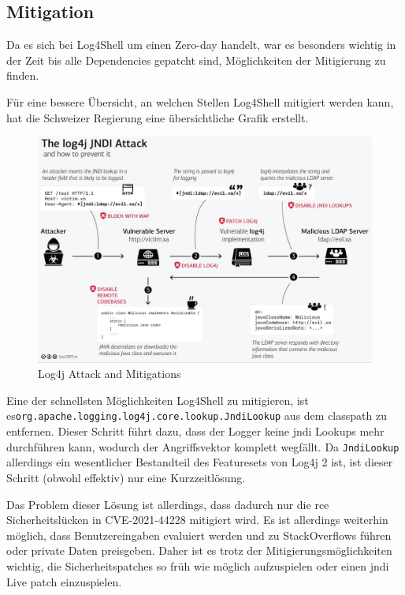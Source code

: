 
\clearpage
\subsection{Mitigation}\label{subsec:mitigation}
Da es sich bei Log4Shell um einen Zero-day handelt, war es besonders wichtig in der Zeit bis alle Dependencies gepatcht sind, Möglichkeiten der Mitigierung zu finden.

Für eine bessere Übersicht, an welchen Stellen Log4Shell mitigiert werden kann, hat die Schweizer Regierung eine übersichtliche Grafik erstellt.

\begin{figure}[!htb]\label{fig:log4jattackgraphic}
    \begin{center}
        \includegraphics[width=\textwidth]{images/log4j_attack}
    \end{center}
    \caption{Log4j Attack and Mitigations}
\end{figure}

Eine der schnellsten Möglichkeiten Log4Shell zu mitigieren, ist es\newline \verb|org.apache.logging.log4j.core.lookup.JndiLookup|\newline
aus dem classpath zu entfernen.
Dieser Schritt führt dazu, dass der Logger keine \gls{jndi} Lookups mehr durchführen kann, wodurch der Angriffsvektor komplett wegfällt.
Da \verb|JndiLookup| allerdings ein wesentlicher Bestandteil des Featuresets von Log4j 2 ist, ist dieser Schritt (obwohl effektiv) nur eine Kurzzeitlösung.

Das Problem dieser Lösung ist allerdings, dass dadurch nur die \gls{rce} Sicherheitslücken in CVE-2021-44228 mitigiert wird.
Es ist allerdings weiterhin möglich, dass Benutzereingaben evaluiert werden und zu StackOverflows führen oder private Daten preisgeben.
Daher ist es trotz der Mitigierungsmöglichkeiten wichtig, die Sicherheitspatches so früh wie möglich aufzuspielen oder einen \gls{jndi} Live patch einzuspielen.
